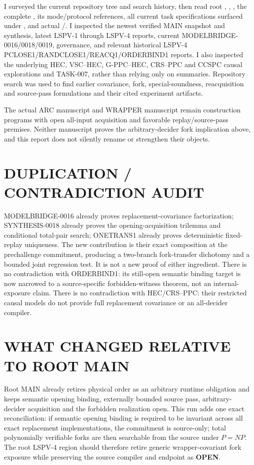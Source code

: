 \documentclass[11pt]{article}
\newcommand{\OPEN}{\textbf{OPEN}}
\begin{document}
I surveyed the current repository tree and search history, then read root
, , , the complete
, its mode/protocol references, all
current task specifications surfaced under , and actual
/.  I inspected the newest verified MAIN
snapshot and synthesis, latest LSPV-1 through LSPV-4 reports, current
MODELBRIDGE-0016/0018/0019, governance, and relevant historical LSPV-4
PCLOSE1/RANDCLOSE1/REACQ1/ORDERBIND1 reports.  I also inspected the underlying
HEC, VSC--HEC, G-PPC--HEC, CRS--PPC and CCSPC causal explorations and TASK-007,
rather than relying only on summaries.  Repository search was used to find
earlier covariance, fork, special-soundness, reacquisition and source-pass
formulations and their cited experiment artifacts.

The actual ARC manuscript  and WRAPPER manuscript
 remain construction programs with open all-input acquisition
and favorable replay/source-pass premises.  Neither manuscript proves the
arbitrary-decider fork implication above, and this report does not silently
rename or strengthen their objects.

\section{DUPLICATION / CONTRADICTION AUDIT}

MODELBRIDGE-0016 already proves replacement-covariance factorization;
SYNTHESIS-0018 already proves the opening-acquisition trilemma and conditional
total-pair search; ONETRANS1 already proves deterministic fixed-replay
uniqueness.  The new contribution is their exact composition at the
prechallenge commitment, producing a two-branch fork-transfer dichotomy and
a bounded joint regression test.  It is not a new proof of either ingredient.
There is no contradiction with ORDERBIND1: its still-open semantic binding
target is now narrowed to a source-specific forbidden-witness theorem, not an
internal-exposure claim.  There is no contradiction with HEC/CRS--PPC: their
restricted causal models do not provide full replacement covariance or an
all-decider compiler.

\section{WHAT CHANGED RELATIVE TO ROOT MAIN}

Root MAIN already retires physical order as an arbitrary runtime obligation
and keeps semantic opening binding, externally bounded source pass,
arbitrary-decider acquisition and the forbidden realization open.  This run
adds one exact reconciliation: if semantic opening binding is required to be
invariant across all exact replacement implementations, the commitment is
source-only; total polynomially verifiable forks are then searchable from the
source under $P=NP$.  The root LSPV-4 region should therefore retire generic
wrapper-covariant fork exposure while preserving the source compiler and
endpoint as \OPEN.
\end{document}
